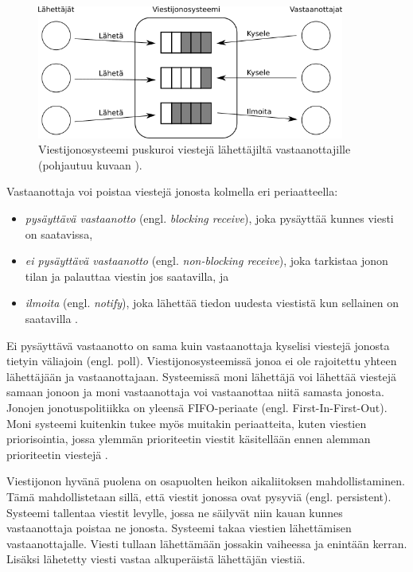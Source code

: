 \begin{figure}[ht!]
	\includegraphics[width=0.9\textwidth]{pictures/message-queue.png}
	\caption{Viestijonosysteemi puskuroi viestejä lähettäjiltä vastaanottajille (pohjautuu kuvaan \mbox{\cite[s.~255]{distributed-systems-concepts-and-design}}).}
	\label{fig:message-queue-communication}
\end{figure}

Vastaanottaja voi poistaa viestejä jonosta kolmella eri periaatteella:
\begin{itemize}
	\item \emph{pysäyttävä vastaanotto} (engl. \emph{blocking receive}), joka pysäyttää kunnes viesti on saatavissa,
	\item \emph{ei pysäyttävä vastaanotto} (engl. \emph{non-blocking receive}), joka tarkistaa jonon tilan ja palauttaa viestin jos saatavilla, ja
	\item \emph{ilmoita} (engl. \emph{notify}), joka lähettää tiedon uudesta viestistä kun sellainen on saatavilla \cite[s.~254]{distributed-systems-concepts-and-design}.
\end{itemize}
Ei pysäyttävä vastaanotto on sama kuin vastaanottaja kyselisi viestejä jonosta tietyin väliajoin (engl. poll). Viestijonosysteemissä jonoa ei ole rajoitettu yhteen lähettäjään ja vastaanottajaan. Systeemissä moni lähettäjä voi lähettää viestejä samaan jonoon ja moni vastaanottaja voi vastaanottaa niitä samasta jonosta. Jonojen jonotuspolitiikka on yleensä FIFO-periaate (engl. First-In-First-Out). Moni systeemi kuitenkin tukee myös muitakin periaatteita, kuten viestien priorisointia, jossa ylemmän prioriteetin viestit käsitellään ennen alemman prioriteetin viestejä \cite[s.~120]{eugster2003many}.

Viestijonon hyvänä puolena on osapuolten heikon aikaliitoksen mahdollistaminen. Tämä mahdollistetaan sillä, että viestit jonossa ovat pysyviä (engl. persistent). Systeemi tallentaa viestit levylle, jossa ne säilyvät niin kauan kunnes vastaanottaja poistaa ne jonosta. Systeemi takaa viestien lähettämisen vastaanottajalle. Viesti tullaan lähettämään jossakin vaiheessa ja enintään kerran. Lisäksi lähetetty viesti vastaa alkuperäistä lähettäjän viestiä. \mbox{\cite[s.~255]{distributed-systems-concepts-and-design}}

